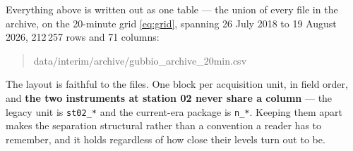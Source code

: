 \documentclass[11pt,a4paper]{article}
\begin{document}
Everything above is written out as one table --- the union of every file in the archive, on the 20-minute grid \eqref{eq:grid}, spanning 26 July 2018 to 19 August 2026, 212\,257 rows and 71 columns:

\begin{quote}
\ttfamily\small data/interim/archive/gubbio\_archive\_20min.csv
\end{quote}

The layout is faithful to the files. One block per acquisition unit, in field order, and \textbf{the two instruments at station 02 never share a column} --- the legacy unit is \texttt{st02\_*} and the current-era package is \texttt{n\_*}. Keeping them apart makes the separation structural rather than a convention a reader has to remember, and it holds regardless of how close their levels turn out to be.
\end{document}
